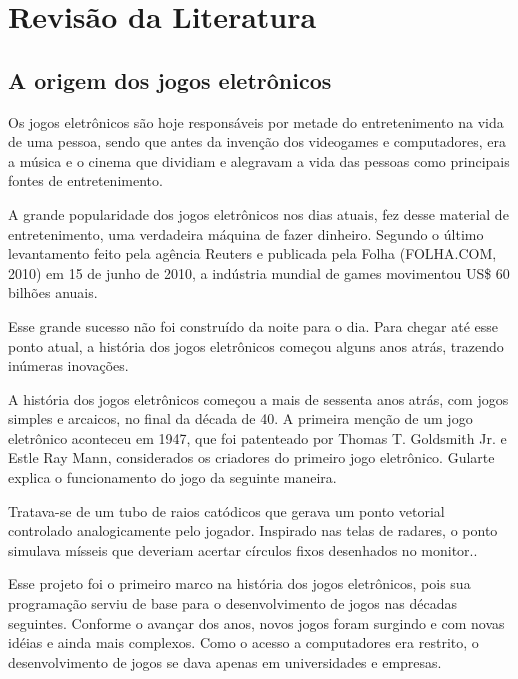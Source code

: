 

\chapter{Revisão da Literatura}

\section{A origem dos jogos eletrônicos}

Os jogos eletrônicos são hoje responsáveis por metade do entretenimento na vida de uma pessoa, sendo que antes da invenção dos videogames e computadores, era a música e o cinema que dividiam e alegravam a vida  das pessoas como principais fontes de entretenimento.

A grande popularidade dos jogos eletrônicos nos dias atuais, fez desse material de entretenimento, uma verdadeira máquina de fazer dinheiro. Segundo o último levantamento feito pela agência Reuters e publicada pela Folha (FOLHA.COM, 2010) em 15 de junho de 2010, a indústria mundial de games movimentou US\$ 60 bilhões anuais.
 
Esse grande sucesso não foi construído da noite para o dia. Para chegar até esse ponto atual, a história dos jogos eletrônicos começou alguns anos atrás, trazendo inúmeras inovações.

A história dos jogos eletrônicos começou a mais de sessenta anos atrás, com jogos simples e arcaicos, no final da década de 40. A primeira menção de um jogo eletrônico aconteceu em 1947, que foi patenteado por Thomas T. Goldsmith Jr. e Estle Ray Mann, considerados os criadores do primeiro jogo eletrônico. Gularte explica o funcionamento do jogo da seguinte maneira.

\begin{citacao}
Tratava-se de um tubo de raios catódicos que gerava um ponto vetorial controlado analogicamente pelo jogador. Inspirado nas telas de radares, o ponto simulava mísseis que deveriam acertar círculos fixos desenhados no monitor.\cite[p.~40]{Gularte}.
\end{citacao}

Esse projeto foi o primeiro marco na história dos jogos eletrônicos, pois sua programação serviu de base para o desenvolvimento de jogos nas décadas seguintes. Conforme o avançar dos anos, novos jogos foram surgindo e com novas idéias e ainda mais complexos. Como o acesso a computadores era restrito, o desenvolvimento de jogos se dava apenas em universidades e empresas.

